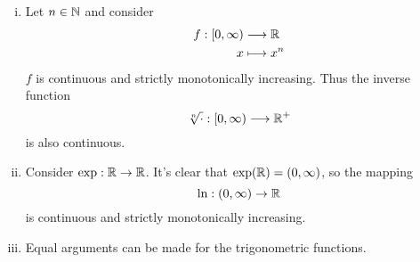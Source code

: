 \documentclass[../script.tex]{subfiles}
\begin{document}
\begin{eg}
    \begin{enumerate}[(i)]
        \item Let $n \in \mathbb{N}$ and consider 
        \begin{align*}
            f: [0, \infty) &\longrightarrow \mathbb{R} \\
            x &\longmapsto x^n
        \end{align*}
        $f$ is continuous and strictly monotonically increasing. Thus the inverse function 
        \[
            \sqrt[n]{\cdot}: [0, \infty) \longrightarrow \mathbb{R}^+
        \]
        is also continuous.

        \item Consider $\exp: \mathbb{R} \rightarrow \mathbb{R}$. It's clear that $\exp(\mathbb{R}) = (0, \infty)$, so the mapping 
        \[
            \ln: (0, \infty) \rightarrow \mathbb{R}
        \]
        is continuous and strictly monotonically increasing.

        \item Equal arguments can be made for the trigonometric functions.
    \end{enumerate}
\end{eg}
\end{document}
